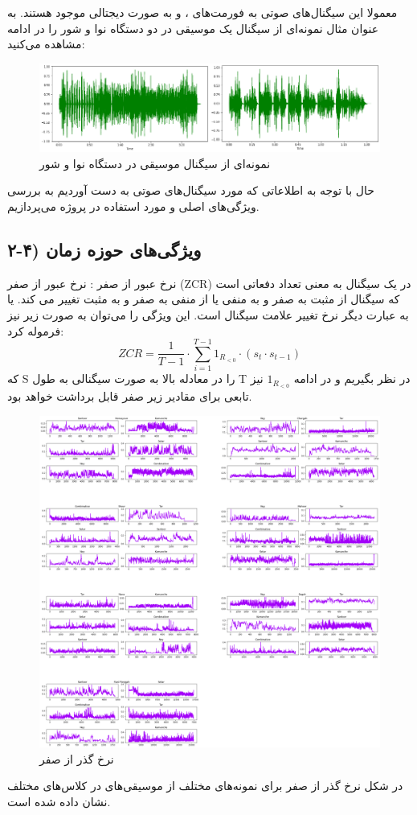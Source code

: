 \documentclass{article}
\begin{document}
معمولا این سیگنال‌های صوتی به فورمت‌های   ،  و  به صورت دیجتالی موجود هستند. به عنوان مثال نمونه‌ای از سیگنال یک موسیقی در دو دستگاه نوا و شور را در ادامه مشاهده می‌کنید:
\begin{figure}[h]
	\centering
	\includegraphics[width=0.7\linewidth]{Photo/3}
	\caption[نمونه‌ای از سیگنال موسیقی در دستگاه نوا و شور]{نمونه‌ای از سیگنال موسیقی در دستگاه نوا و شور}
	\label{fig:3}
\end{figure}
حال با توجه به اطلاعاتی که مورد سیگنال‌های صوتی به دست آوردیم به بررسی ویژگی‌های اصلی و مورد استفاده در پروژه می‌پردازیم.
\subsection{۲-۴) ویژگی‌های حوزه زمان}
نرخ عبور از صفر : \newline
نرخ عبور از صفر (ZCR) در یک سیگنال به معنی تعداد دفعاتی است که سیگنال از مثبت به صفر و به منفی یا از منفی به صفر و به مثبت تغییر می کند. یا به عبارت دیگر نرخ تغییر علامت سیگنال است. این ویژگی را می‌توان به صورت زیر نیز فرموله کرد: 
\begin{equation}
	ZCR=\dfrac{1}{T - 1} \cdot \sum_{i=1}^{T-1} 1_{R_{<0}}\cdot(s_{t} \cdot s_{t-1})
\end{equation}
که S را در معادله بالا به صورت سیگنالی به طول T در نظر بگیریم و در ادامه  $ 1_{R_{<0}} $ نیز تابعی برای مقادیر زیر صفر قابل برداشت خواهد بود.\newline
\begin{figure}[h]
	\centering
	\includegraphics[width=0.5\linewidth]{Photo/Zero_crossing}
	\caption[نرخ گذر از صفر]{نرخ گذر از صفر}
	\label{fig:24}
\end{figure}
در شکل نرخ گذر از صفر برای نمونه‌های مختلف از موسیقی‌های در کلاس‌های مختلف نشان داده شده است.
\end{document}
